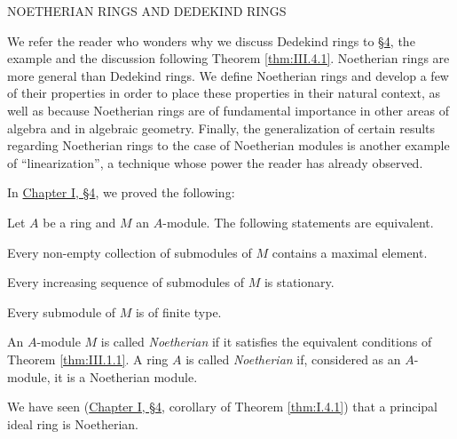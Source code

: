 \clearpage
{}%
%
            {NOETHERIAN RINGS AND DEDEKIND RINGS}

We refer the reader who wonders why we discuss Dedekind rings to \hyperref[sec:3.4]{§4}, the
example and the discussion following Theorem \ref{thm:III.4.1}. Noetherian
rings are more general than Dedekind rings. We define Noetherian rings and
develop a few of their properties in order to place these properties in
their natural context, as well as because Noetherian rings are of
fundamental importance in other areas of algebra and in algebraic geometry.
Finally, the generalization of certain results regarding Noetherian rings to
the case of Noetherian modules is another example of ``linearization'', a
technique whose power the reader has already observed.


In \hyperref[sec:1.4]{Chapter I, §4}, we proved the following:

\begin{theorem}
\label{thm:III.1.1}
Let $A$ be a ring and $M$ an $A$-module. The following statements are
equivalent.
\begin{alist}
\item Every non-empty collection of submodules of $M$ contains a maximal
element.
\item Every increasing sequence of submodules of $M$ is stationary.
\item Every submodule of $M$ is of finite type.
\end{alist}
\end{theorem}

\begin{definition}
\label{def:III.1.1}
An $A$-module $M$ is called \emph{Noetherian} if it satisfies the equivalent
conditions of Theorem \ref{thm:III.1.1}. A ring $A$ is called
\emph{Noetherian} if, considered as an $A$-module, it is a Noetherian module.
\end{definition}

We have seen (\hyperref[sec:1.4]{Chapter I, §4}, corollary of Theorem \ref{thm:I.4.1}) that a
principal ideal ring is Noetherian.


